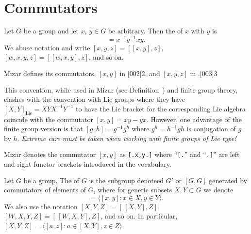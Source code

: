 \section{Commutators}

\begin{definition}
  Let $G$ be a group and let $x$, $y\in G$ be arbitrary.
  Then the  of $x$ with $y$ is
  \begin{equation*}
    [x,y] = x^{-1}y^{-1}xy.
  \end{equation*}
  We abuse notation and write $[x,y,z] = [{[x,y]},z]$,
  $[w,x,y,z] = [{[w,x,y]},z]$, and so on.
\end{definition}

\begin{def-remark}
Mizar defines its commutators, $[x,y]$ in [002]{2}, and
$[x,y,z]$ in .[003]{3}
\end{def-remark}

\begin{def-remark}
This convention, while used in Mizar (see Definition~)
and finite group theory, clashes with the convention with Lie groups
where they have $[X,Y]_{\text{Lie}}=XYX^{-1}Y^{-1}$ to have the Lie
bracket for the corresponding Lie algebra coincide with the commutator
$[x,y] = xy - yx$. However, one advantage of the finite group version is
that $[g,h] = g^{-1}g^{h}$ where $g^{h}=h^{-1}gh$ is conjugation of $g$
by $h$. \emph{Extreme care must be taken when working with finite groups
of Lie type!}
\end{def-remark}

\begin{notation}
  Mizar denotes the commutator $[x,y]$ as \lstinline![.x,y.]! where
  ``\verb#[.#'' and ``\verb#.]#'' are left and right functor brackets
  introduced in the  vocabulary.
\end{notation}

\begin{definition}\index{$[G,G]$}
Let $G$ be a group. The  of $G$ is the subgroup
denoteed $G'$ or $[G,G]$ generated by commutators of elements of $G$, where
for generic subsets $X,Y\subset G$ we denote
\begin{equation}
  [X,Y] = \langle [x,y] : x\in X,y\in Y\rangle.
\end{equation}
We also use the notation $[X,Y,Z] = [\,{[X,Y]},Z]$, $[W,X,Y,Z] = [\,{[W,X,Y]},Z]$,
and so on. In particular, $[X,Y,Z] = \langle [a,z] : a\in[X,Y], z\in Z\rangle$.
\end{definition}

